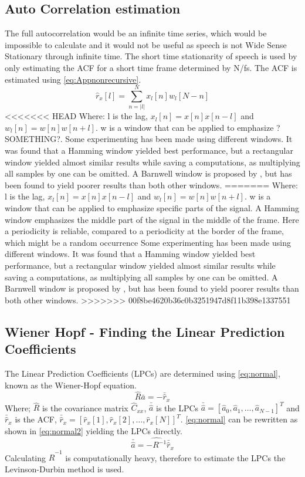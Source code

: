 \subsection{Auto Correlation estimation}
The full autocorrelation would be an infinite time series, which would be impossible to calculate and it would not be useful as speech is not Wide Sense Stationary through infinite time. The short time stationarity of speech is used by only estimating the ACF for a short time frame determined by N/fs. The ACF is estimated using \autoref{eq:Appnonrecursive}.
\begin{equation}\label{eq:Appnonrecursive}
\hat{r}_x[l] = \sum^{N}_{n=\left| l\right|} x_l[n]w_l[N-n]
\end{equation}
<<<<<<< HEAD
Where: l is the lag, $x_l[n]=x[n]x[n-l]$ and $w_l[n]=w[n]w[n+l]$. w is a window that can be applied to emphasize ?SOMETHING?. Some experimenting has been made using different windows. It was found that a Hamming window yielded best performance, but a rectangular window yielded almost similar results while saving a computations, as multiplying all samples by one can be omitted. A Barnwell window is proposed by \cite{Speech}, but has been found to yield poorer results than both other windows.   
=======
Where: l is the lag, $x_l[n]=x[n]x[n-l]$ and $w_l[n]=w[n]w[n+l]$. w is a window that can be applied to emphasize specific parts of the signal. A Hamming window emphasizes the middle part of the signal in the middle of the frame. Here a periodicity is reliable, compared to a periodicity at the border of the frame, which might be a random occurrence Some experimenting has been made using different windows. It was found that a Hamming window yielded best performance, but a rectangular window yielded almost similar results while saving a computations, as multiplying all samples by one can be omitted. A Barnwell window is proposed by \cite{Speech}, but has been found to yield poorer results than both other windows.   
>>>>>>> 00f8be4620b36c0b3251947d8f11b398e1337551

\subsection{ Wiener Hopf - Finding the Linear Prediction Coefficients}
 The Linear Prediction Coefficients (LPCs) are determined using \autoref{eq:normal}, known as the Wiener-Hopf equation.
\begin{equation}\label{eq:normal}
\hat{R}  \bar{a} = -\bar{\hat{r}}_x
\end{equation}
Where; $\hat{R}$ is the covariance matrix $\hat{C}_{xx}$, $\bar{\hat{a}}$ is the LPCs $\bar{\hat{a}} = [\hat{a}_0 , \hat{a}_1, \dotsc, \hat{a}_{N-1}]^T$ and $\bar{\hat{r}}_x$ is the ACF, $\bar{\hat{r}}_x = [\hat{r}_x[1] , \hat{r}_x[2], \dotsc, \hat{r}_x[N]]^T$. \autoref{eq:normal} can be rewritten as shown in \autoref{eq:normal2} yielding the LPCs directly.  
\begin{equation}\label{eq:normal2}
\bar{\hat{a}} = \hat{-R^{-1}} \bar{\hat{r}}_x
\end{equation}
Calculating $\hat{R}^{-1}$ is computationally heavy, therefore to estimate the LPCs the Levinson-Durbin method is used. 


